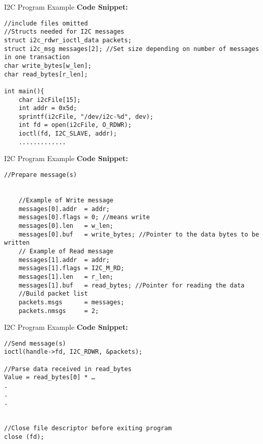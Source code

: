 \begin{frame}[fragile]{I2C Program Example}
    \textbf{Code Snippet:}
    \begin{verbatim}
//include files omitted
//Structs needed for I2C messages
struct i2c_rdwr_ioctl_data packets;
struct i2c_msg messages[2]; //Set size depending on number of messages in one transaction
char write_bytes[w_len];
char read_bytes[r_len];

int main(){
    char i2cFile[15];
    int addr = 0x5d; 
    sprintf(i2cFile, "/dev/i2c-%d", dev);
    int fd = open(i2cFile, O_RDWR); 
    ioctl(fd, I2C_SLAVE, addr);
    .............

    \end{verbatim}

\end{frame}

\begin{frame}[fragile]{I2C Program Example}
    \textbf{Code Snippet:}
    \begin{verbatim}
//Prepare message(s)


    //Example of Write message
    messages[0].addr  = addr;
    messages[0].flags = 0; //means write
    messages[0].len   = w_len;
    messages[0].buf   = write_bytes; //Pointer to the data bytes to be written 
    // Example of Read message
    messages[1].addr  = addr;
    messages[1].flags = I2C_M_RD;
    messages[1].len   = r_len; 
    messages[1].buf   = read_bytes; //Pointer for reading the data
    //Build packet list
    packets.msgs      = messages;
    packets.nmsgs     = 2;

    \end{verbatim}

\end{frame}

\begin{frame}[fragile]{I2C Program Example}
    \textbf{Code Snippet:}
    \begin{verbatim}
//Send message(s)
ioctl(handle->fd, I2C_RDWR, &packets);

//Parse data received in read_bytes
Value = read_bytes[0] * …
.
.
.


//Close file descriptor before exiting program
close (fd);

    \end{verbatim}

\end{frame}


